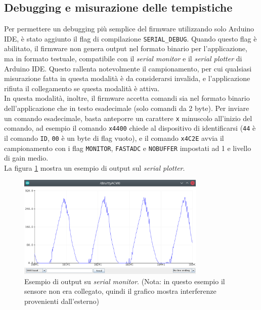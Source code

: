 \subsection{Debugging e misurazione delle tempistiche}
Per permettere un debugging più semplice del firmware utilizzando solo Arduino IDE, è stato aggiunto il flag di compilazione \texttt{SERIAL\_DEBUG}. Quando questo flag è abilitato, il firmware non genera output nel formato binario per l'applicazione, ma in formato testuale, compatibile con il \textit{serial monitor} e il \textit{serial plotter} di Arduino IDE. Questo rallenta notevolmente il campionamento, per cui qualsiasi misurazione fatta in questa modalità è da considerarsi invalida, e l'applicazione rifiuta il collegamento se questa modalità è attiva.\\
In questa modalità, inoltre, il firmware accetta comandi sia nel formato binario dell'applicazione che in testo esadecimale (solo comandi da 2 byte). Per inviare un comando esadecimale, basta anteporre un carattere \texttt{x} minuscolo all'inizio del comando, ad esempio il comando \texttt{x4400} chiede al dispositivo di identificarsi (\texttt{44} è il comando \texttt{ID}, \texttt{00} è un byte di flag vuoto), e il comando \texttt{x4C2E} avvia il campionamento con i flag \texttt{MONITOR}, \texttt{FASTADC} e \texttt{NOBUFFER} impostati ad 1 e livello di gain medio.\\
La figura \ref{fig:serialdebug} mostra un esempio di output sul \textit{serial plotter}.

\begin{figure}[h]
	\centering
	\includegraphics[width=0.8\textwidth]{Dispositivo_files/serialdebug.png}
	\caption{Esempio di output su \textit{serial monitor}. (Nota: in questo esempio il sensore non era collegato, quindi il grafico mostra interferenze provenienti dall'esterno)}
	\label{fig:serialdebug}
\end{figure}


